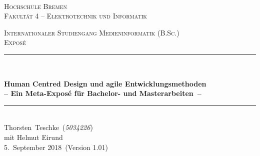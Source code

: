 \documentclass[11pt]{scrartcl}
\newcommand{\MetaInstitute}{Hochschule Bremen}
\newcommand{\MetaUnit}{Fakultät 4 -- Elektrotechnik und Informatik}
\newcommand{\MetaTitle}{ Human Centred Design und agile Entwicklungsmethoden}
\newcommand{\MetaSubtitle}{Ein Meta-Exposé für Bachelor- und Masterarbeiten}
\newcommand{\MetaTask}{Exposé}
\newcommand{\MetaAuthorName}{Thorsten}
\newcommand{\MetaAuthorSurname}{Teschke}
\newcommand{\MetaAuthor}{\MetaAuthorName~\MetaAuthorSurname}
\newcommand{\MetaStudentNumber}{\textit{5034226}}
\newcommand{\MetaStudyProgram}{Internationaler Studiengang Medieninformatik (B.Sc.)}
\newcommand{\MetaCoAuthor}{mit Helmut Eirund}
\newcommand{\MetaDate}{5.\ September 2018}
\newcommand{\MetaVersion}{1.01}
\newcommand{\HRule}{\rule{\linewidth}{0.2mm}}	%
\begin{document}
\begin{titlepage}
  	\shortdate %
  	\center %

  	~\\[1cm]


	\begin{figure}[h!]
    		\centering
	\end{figure}

	\vspace{-0.5cm}
	\textsc{\Large \MetaInstitute}\\[0.2cm] %
	\textsc{\Large \MetaUnit}%
	
	\textsc{\large \MetaStudyProgram}\\[1.5cm]
	
	\textsc{\LARGE \MetaTask}\\[1.5cm] %

	\HRule \\[0.5cm]
	{
		\LARGE \bfseries \MetaTitle \\[0.50cm] %
		\Large \bfseries -- \MetaSubtitle\ -- \\[0.50cm] %
		\par
	}
	\HRule \\[1.5cm]

	\large 
	\MetaAuthor\ (\MetaStudentNumber)\\
 	\MetaCoAuthor\\[0.25cm]

	\vspace*{\fill}
	{
     \large \MetaDate\ (Version \MetaVersion)
	}
\end{titlepage}
\end{document}
